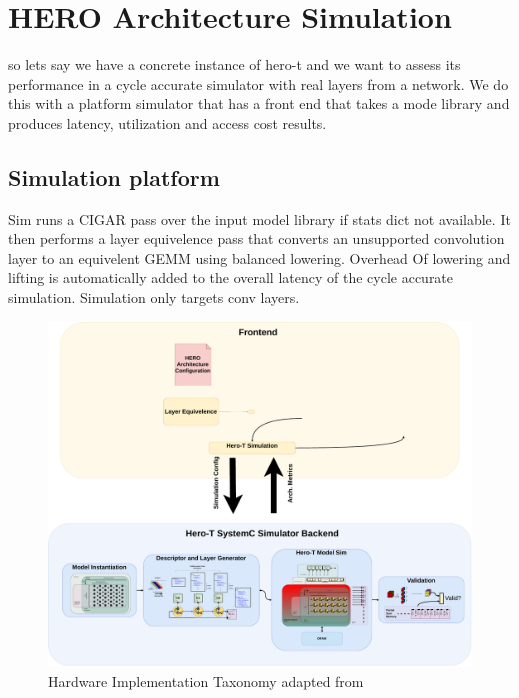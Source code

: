 
\chapter{HERO Architecture Simulation}
\label{chap:results}

so lets say we have a concrete instance of hero-t and we want to assess its
performance in a cycle accurate simulator with real layers from a network. We do
this with a platform simulator that has a front end that takes a mode library
and produces latency, utilization and access cost results.  

\section{Simulation platform}
\label{chap:hero:sim_platform}

Sim runs a CIGAR pass over the input model library if stats dict not available.
It then performs a layer equivelence pass that converts an unsupported
convolution layer to an equivelent GEMM using balanced lowering. Overhead Of
lowering and lifting is automatically added to the overall latency of the cycle
accurate simulation. Simulation only targets conv layers. 

\begin{figure}[ht]
    \centering
    \includegraphics[scale=0.58]{fig/hero-t-sim-platform.pdf}
    \caption{Hardware Implementation Taxonomy adapted from \cite{maestro}}
    \label{fig:hw_taxonomy}
\end{figure}


